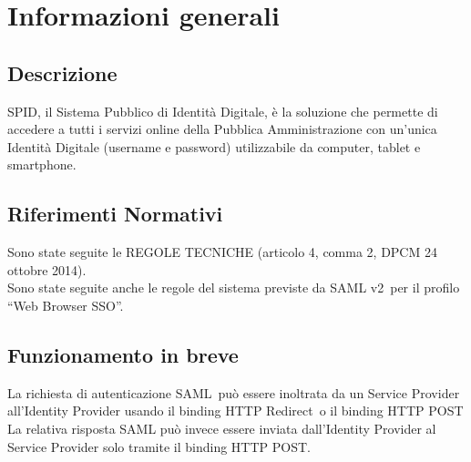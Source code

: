 \section{Informazioni generali}
\subsection{Descrizione}
SPID, il Sistema Pubblico di Identità Digitale, è la soluzione che permette di accedere a tutti i servizi online della Pubblica Amministrazione con un'unica Identità Digitale (username e password) utilizzabile da computer, tablet e smartphone.
\subsection{Riferimenti Normativi}
Sono state seguite le REGOLE TECNICHE (articolo 4, comma 2, DPCM 24 ottobre 2014).
\\ Sono state seguite anche le regole del sistema previste da SAML v2\glo\ per il profilo “Web
Browser SSO”.
\subsection{Funzionamento in breve}
La richiesta di autenticazione SAML\glo\ può essere inoltrata 
da un Service Provider all’Identity Provider
usando il binding HTTP Redirect\glo\ o il binding HTTP POST\glo\.
\\ La relativa risposta SAML può invece essere inviata
dall’Identity Provider al Service Provider 
solo tramite il binding HTTP POST.